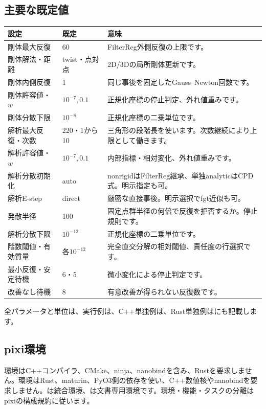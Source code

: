 \documentclass[a4paper,11pt]{article}
\newcommand{\code}[1]{\texttt{\detokenize{#1}}}
\numberwithin{equation}{section}
\begin{document}
\subsection{主要な既定値}
\begin{longtable}{@{}p{48mm}p{28mm}p{77mm}@{}}
\toprule
設定 & 既定 & 意味\\\midrule\endhead
剛体最大反復 & 60 & FilterReg外側反復の上限です。\\
剛体解法・距離 & twist・点対点 & 2D/3Dの局所剛体更新です。\\
剛体内側反復 & 1 & 同じ事後を固定したGauss--Newton回数です。\\
剛体許容値・\(w\) & \(10^{-7},0.1\) & 正規化座標の停止判定、外れ値重みです。\\
剛体分散下限 & \(10^{-8}\) & 正規化座標の二乗単位です。\\
解析最大反復・次数 & 220・1から10 & 三角形の段階長を使います。次数継続により上限として働きます。\\
解析許容値・\(w\) & \(10^{-7},0.1\) & 内部指標・相対変化、外れ値重みです。\\
解析分散初期化 & auto & nonrigidはFilterReg継承、単独analyticはCPD式。明示指定も可。\\
解析E-step & direct & 厳密な直接事後。明示選択でfgt近似も可。\\
発散半径 & 100 & 固定点群半径の何倍で反復を拒否するか。停止規則です。\\
解析分散下限 & \(10^{-12}\) & 正規化座標の二乗単位です。\\
階数閾値・有効質量 & 各\(10^{-12}\) & 完全直交分解の相対閾値、責任度の行選択です。\\
最小反復・安定待機 & 6・5 & 微小変化による停止判定です。\\
改善なし待機 & 8 & 有意改善が得られない反復数です。\\
\bottomrule
\end{longtable}
全パラメータと単位は、実行例は、C++単独例は、Rust単独例はにも記載します。

\subsection{pixi環境}
\code{cpp}環境はC++コンパイラ、CMake、ninja、nanobindを含み、Rustを要求しません。\code{rust}環境はRust、maturin、PyO3側の依存を使い、C++数値核やnanobindを要求しません。\code{default}は統合環境、\code{docs}は文書専用環境です。環境・機能・タスクの分離はpixiの構成規約に従います。\cite{pixidoc}
\end{document}
